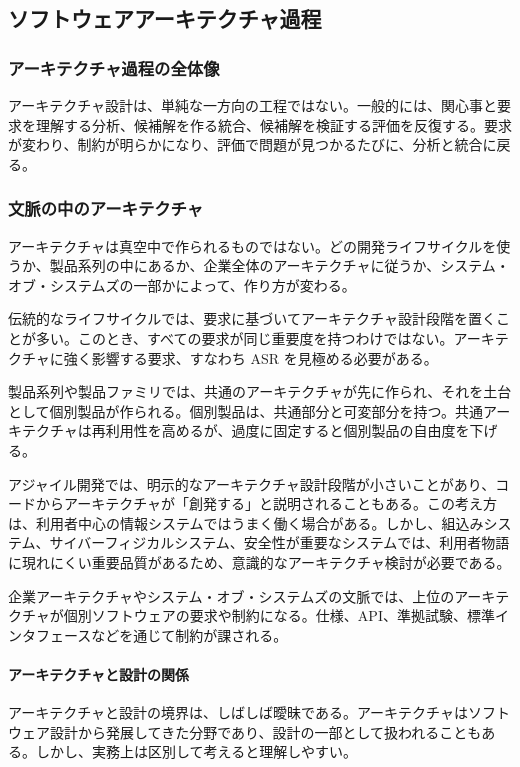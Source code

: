 \documentclass[a4paper,11pt]{ltjsarticle}
\numberwithin{figure}{section}
\numberwithin{table}{section}
\begin{document}
\subsection{ソフトウェアアーキテクチャ過程}

\subsubsection*{アーキテクチャ過程の全体像}
アーキテクチャ設計は、単純な一方向の工程ではない。一般的には、関心事と要求を理解する分析、候補解を作る統合、候補解を検証する評価を反復する。要求が変わり、制約が明らかになり、評価で問題が見つかるたびに、分析と統合に戻る。

\subsubsection{文脈の中のアーキテクチャ}
アーキテクチャは真空中で作られるものではない。どの開発ライフサイクルを使うか、製品系列の中にあるか、企業全体のアーキテクチャに従うか、システム・オブ・システムズの一部かによって、作り方が変わる。

伝統的なライフサイクルでは、要求に基づいてアーキテクチャ設計段階を置くことが多い。このとき、すべての要求が同じ重要度を持つわけではない。アーキテクチャに強く影響する要求、すなわち ASR を見極める必要がある。

製品系列や製品ファミリでは、共通のアーキテクチャが先に作られ、それを土台として個別製品が作られる。個別製品は、共通部分と可変部分を持つ。共通アーキテクチャは再利用性を高めるが、過度に固定すると個別製品の自由度を下げる。

アジャイル開発では、明示的なアーキテクチャ設計段階が小さいことがあり、コードからアーキテクチャが「創発する」と説明されることもある。この考え方は、利用者中心の情報システムではうまく働く場合がある。しかし、組込みシステム、サイバーフィジカルシステム、安全性が重要なシステムでは、利用者物語に現れにくい重要品質があるため、意識的なアーキテクチャ検討が必要である。

企業アーキテクチャやシステム・オブ・システムズの文脈では、上位のアーキテクチャが個別ソフトウェアの要求や制約になる。仕様、API、準拠試験、標準インタフェースなどを通じて制約が課される。

\paragraph{アーキテクチャと設計の関係}
アーキテクチャと設計の境界は、しばしば曖昧である。アーキテクチャはソフトウェア設計から発展してきた分野であり、設計の一部として扱われることもある。しかし、実務上は区別して考えると理解しやすい。
\end{document}

